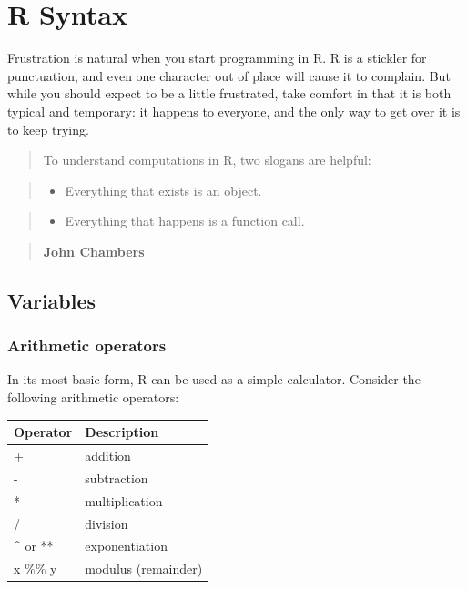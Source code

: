 \documentclass[
]{book}
\providecommand{\tightlist}{%
  \setlength{\itemsep}{0pt}\setlength{\parskip}{0pt}}
\begin{document}
\hypertarget{r-syntax}{%
\chapter{R Syntax}\label{r-syntax}}

Frustration is natural when you start programming in R. R is a stickler for punctuation, and even one character out of place will cause it to complain. But while you should expect to be a little frustrated, take comfort in that it is both typical and temporary: it happens to everyone, and the only way to get over it is to keep trying.

\begin{quote}
To understand computations in R, two slogans are helpful:
\end{quote}

\begin{quote}
\begin{itemize}
\tightlist
\item
  Everything that exists is an object.
\end{itemize}
\end{quote}

\begin{quote}
\begin{itemize}
\tightlist
\item
  Everything that happens is a function call.
\end{itemize}
\end{quote}

\begin{quote}
\textbf{John Chambers}
\end{quote}

\hypertarget{variables}{%
\section{Variables}\label{variables}}

\hypertarget{arithmetic-operators}{%
\subsection{Arithmetic operators}\label{arithmetic-operators}}

In its most basic form, R can be used as a simple calculator. Consider the following arithmetic operators:

\begin{longtable}[]{@{}ll@{}}
\toprule
Operator & Description\tabularnewline
\midrule
\endhead
+ & addition\tabularnewline
- & subtraction\tabularnewline
* & multiplication\tabularnewline
/ & division\tabularnewline
\^{} or ** & exponentiation\tabularnewline
x \%\% y & modulus (remainder)\tabularnewline
\bottomrule
\end{longtable}
\end{document}
